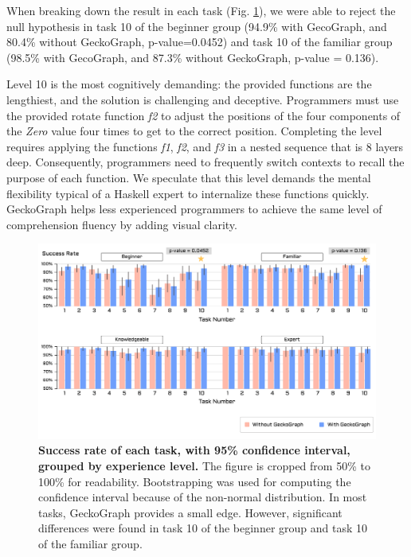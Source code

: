 \documentclass[preprint,12pt]{elsarticle}
\begin{document}
When breaking down the result in each task (Fig. \ref{fig:success-rate}), we were able to reject the null hypothesis in task 10 of the beginner group (94.9\% with GecoGraph, and 80.4\% without GeckoGraph, p-value=0.0452) and task 10 of the familiar group (98.5\% with GecoGraph, and 87.3\% without GeckoGraph, p-value = 0.136). 

Level 10 is the most cognitively demanding: the provided functions are the lengthiest, and the solution is challenging and deceptive. Programmers must use the provided rotate function {\it f2} to adjust the positions of the four components of the {\it Zero} value four times to get to the correct position. Completing the level requires applying the functions {\it f1}, {\it f2}, and {\it f3} in a nested sequence that is 8 layers deep. Consequently, programmers need to frequently switch contexts to recall the purpose of each function. We speculate that this level demands the mental flexibility typical of a Haskell expert to internalize these functions quickly. GeckoGraph helps less experienced programmers to achieve the same level of comprehension fluency by adding visual clarity.

\begin{figure}[ht]
  \includegraphics[width=\linewidth]{figures/SuccessfulRate}
  \caption{\label{fig:success-rate}{\bf Success rate of each task, with 95\% confidence interval, grouped by experience level.} The figure is cropped from 50\% to 100\% for readability. Bootstrapping was used for computing the confidence interval because of the non-normal distribution. In most tasks, GeckoGraph provides a small edge. However, significant differences were found in task 10 of the beginner group and task 10 of the familiar group. }
\end{figure}
\end{document}
